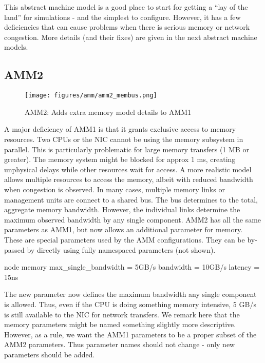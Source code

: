 This abstract machine model is a good place to start for getting a ``lay of the land'' for simulations - and the simplest to configure.
However, it has a few deficiencies that can cause problems when there is serious memory or network congestion.
More details (and their fixes) are given in the next abstract machine models. 	

\subsection{AMM2}
\label{subsec:amm2}

\begin{figure}
\begin{center}
\texttt{[image: figures/amm/amm2\_membus.png]}
\end{center}
\caption{AMM2: Adds extra memory model details to AMM1}
\label{fig:amm2}
\end{figure}

A major deficiency of AMM1 is that it grants exclusive access to memory resources.
Two CPUs or the NIC cannot be using the memory subsystem in parallel.
This is particularly problematic for large memory transfers (1 MB or greater).
The memory system might be blocked for approx 1 ms,
creating unphysical delays while other resources wait for access.
A more realistic model allows multiple resources to access the memory,
albeit with reduced bandwidth when congestion is observed.
In many cases, multiple memory links or management units are connect to a shared bus.
The bus determines to the total, aggregate memory bandwidth.
However, the individual links determine the maximum observed bandwidth by any single component.
AMM2 has all the same parameters as AMM1, but now allows an additional parameter for memory.
These are special parameters used by the AMM configurations.
They can be by-passed by directly using fully namespaced parameters (not shown).

\begin{ViFile}
node {
 memory {
  max_single_bandwidth = 5GB/s
  bandwidth = 10GB/s
  latency = 15ns
 }
}

\end{ViFile}
The new parameter  now defines the maximum bandwidth any single component is allowed.
Thus, even if the CPU is doing something memory intensive, 5 GB/s is still available to the NIC for network transfers.
We remark here that the memory parameters might be named something slightly more descriptive.
However, as a rule, we want the AMM1 parameters to be a proper subset of the AMM2 parameters.
Thus parameter names should not change - only new parameters should be added.

